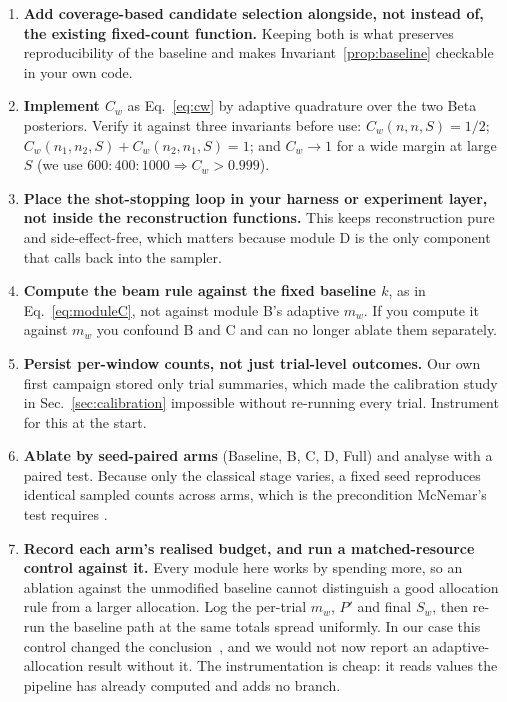 \documentclass[final,5p,times,longtitle]{elsarticle}
\newcommand{\Cw}{C_w}
\begin{document}
\begin{enumerate}
\item \textbf{Add coverage-based candidate selection alongside, not
instead of, the existing fixed-count function.} Keeping both is what
preserves reproducibility of the baseline and makes
Invariant~\ref{prop:baseline} checkable in your own code.
\item \textbf{Implement $\Cw$} as Eq.~\eqref{eq:cw} by adaptive
quadrature over the two Beta posteriors. Verify it against three
invariants before use: $\Cw(n,n,S)=1/2$; $\Cw(n_1,n_2,S)+\Cw(n_2,n_1,S)=1$;
and $\Cw \to 1$ for a wide margin at large $S$ (we use
$600{:}400{:}1000 \Rightarrow \Cw > 0.999$).
\item \textbf{Place the shot-stopping loop in your harness or experiment
layer, not inside the reconstruction functions.} This keeps
reconstruction pure and side-effect-free, which matters because module D
is the only component that calls back into the sampler.
\item \textbf{Compute the beam rule against the fixed baseline $k$}, as
in Eq.~\eqref{eq:moduleC}, not against module B's adaptive $m_w$. If you
compute it against $m_w$ you confound B and C and can no longer ablate
them separately.
\item \textbf{Persist per-window counts, not just trial-level outcomes.}
Our own first campaign stored only trial summaries, which made the
calibration study in Sec.~\ref{sec:calibration} impossible without
re-running every trial. Instrument for this at the start.
\item \textbf{Ablate by seed-paired arms} (Baseline, B, C, D, Full) and
analyse with a paired test. Because only the classical stage varies, a
fixed seed reproduces identical sampled counts across arms, which is the
precondition McNemar's test requires \cite{dietterich1998}.
\item \textbf{Record each arm's realised budget, and run a
matched-resource control against it.} Every module here works by spending
more, so an ablation against the unmodified baseline cannot distinguish a
good allocation rule from a larger allocation. Log the per-trial $m_w$,
$P'$ and final $S_w$, then re-run the baseline path at the same totals
spread uniformly. In our case this control changed the
conclusion~\cite{companion}, and we would not now report an
adaptive-allocation result without it. The instrumentation is cheap: it
reads values the pipeline has already computed and adds no branch.
\end{enumerate}
\end{document}
